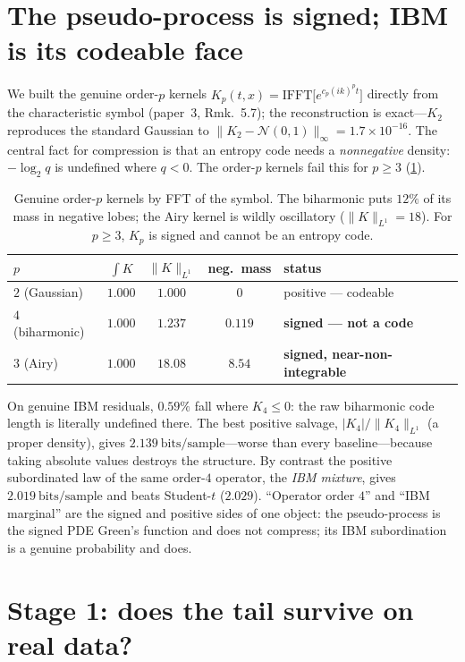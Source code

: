 \documentclass[11pt,reqno]{amsart}
\theoremstyle{plain}
\theoremstyle{definition}
\theoremstyle{remark}
\newcommand{\bps}{\mathrm{bits/sample}}
\begin{document}
\section{The pseudo-process is signed; IBM is its codeable face}
\label{sec:signed}

We built the genuine order-$p$ kernels
$K_p(t,x)=\mathrm{IFFT}\bigl[e^{c_p(ik)^p t}\bigr]$ directly from the
characteristic symbol (paper~3, Rmk.~5.7); the reconstruction is exact---$K_2$
reproduces the standard Gaussian to $\|K_2-\mathcal N(0,1)\|_\infty=1.7\times
10^{-16}$. The central fact for compression is that an entropy code needs a
\emph{nonnegative} density: $-\log_2 q$ is undefined where $q<0$. The order-$p$
kernels fail this for $p\ge3$ (\cref{tab:signed}).

\begin{table}[h]
\centering\small
\begin{tabular}{lcccl}
\toprule
$p$ & $\int K$ & $\|K\|_{L^1}$ & neg.\ mass & status\\
\midrule
$2$ (Gaussian)   & $1.000$ & $1.000$  & $0$     & positive --- codeable\\
$4$ (biharmonic) & $1.000$ & $1.237$  & $0.119$ & \textbf{signed --- not a code}\\
$3$ (Airy)       & $1.000$ & $18.08$  & $8.54$  & \textbf{signed, near-non-integrable}\\
\bottomrule
\end{tabular}
\caption{Genuine order-$p$ kernels by FFT of the symbol. The biharmonic puts
$12\%$ of its mass in negative lobes; the Airy kernel is wildly oscillatory
($\|K\|_{L^1}=18$). For $p\ge3$, $K_p$ is signed and cannot be an entropy code.}
\label{tab:signed}
\end{table}

On genuine IBM residuals, $0.59\%$ fall where $K_4\le0$: the raw biharmonic code
length is literally undefined there. The best positive salvage, $|K_4|/\|K_4\|_{L^1}$
(a proper density), gives $2.139~\bps$---worse than every baseline---because
taking absolute values destroys the structure. By contrast the positive
subordinated law of the same order-$4$ operator, the \emph{IBM mixture}, gives
$2.019~\bps$ and beats Student-$t$ ($2.029$). ``Operator order $4$'' and ``IBM
marginal'' are the signed and positive sides of one object: the pseudo-process is
the signed PDE Green's function and does not compress; its IBM subordination is a
genuine probability and does.

\section{Stage 1: does the tail survive on real data?}
\label{sec:stage1}
\end{document}

